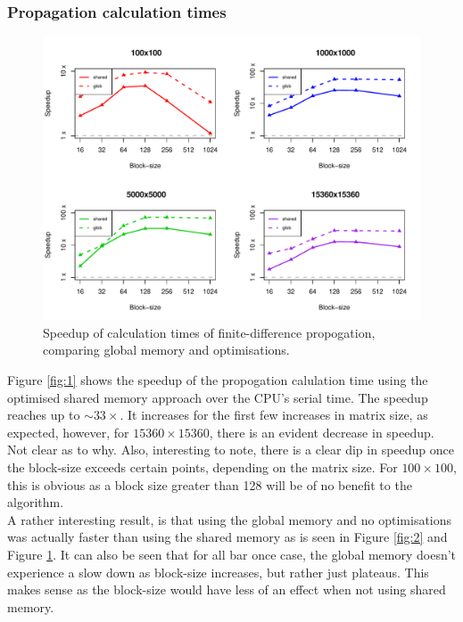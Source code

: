 \documentclass[12pt]{article}
\begin{document}
\subsubsection*{Propagation calculation times}
\begin{figure}
	\centering
	\includegraphics[width=\linewidth]{../plots/fdcalc_sharedvglob.pdf}
	\caption{Speedup of calculation times of finite-difference propogation, comparing global memory and optimisations.}
	\label{fig:3}
\end{figure}
Figure \ref{fig:1} shows the speedup of the propogation calulation time using the optimised shared memory approach over the CPU's serial time. The speedup reaches up to $\sim33\times$. It increases for the first few increases in matrix size, as expected, however, for $15360\times15360$, there is an evident decrease in speedup. Not clear as to why. Also, interesting to note, there is a clear dip in speedup once the block-size exceeds certain points, depending on the matrix size. For $100\times100$, this is obvious as a block size greater than 128 will be of no benefit to the algorithm.\\
A rather interesting result, is that using the global memory and no optimisations was actually faster than using the shared memory as is seen in Figure \ref{fig:2} and Figure \ref{fig:3}. It can also be seen that for all bar once case, the global memory doesn't experience a slow down as block-size increases, but rather just plateaus. This makes sense as the block-size would have less of an effect when not using shared memory.
\end{document}
